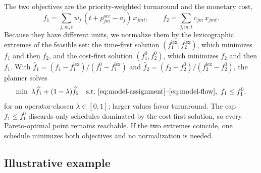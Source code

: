 \documentclass[conference]{IEEEtran}
\begin{document}
The two objectives are the priority-weighted turnaround and the monetary cost,
\begin{equation}
 f_1=\sum_{j,m,t} w_j\,(t+p_{jm}^{\mathrm{occ}}-a_j)\,x_{jmt},\qquad
 f_2=\sum_{j,m,t} c_{jm}\,x_{jmt}.
\end{equation}
Because they have different units, we normalize them by the lexicographic extremes of the feasible set: the time-first solution $(f_1^{\mathrm{lex}},f_2^{\mathrm{lex}})$, which minimizes $f_1$ and then $f_2$, and the cost-first solution $(f_1^{0},f_2^{0})$, which minimizes $f_2$ and then $f_1$. With $\widehat f_1=(f_1-f_1^{\mathrm{lex}})/(f_1^0-f_1^{\mathrm{lex}})$ and $\widehat f_2=(f_2-f_2^0)/(f_2^{\mathrm{lex}}-f_2^0)$, the planner solves
\begin{equation}
\label{eq:scalarization}
\min\ \lambda\widehat f_1+(1-\lambda)\widehat f_2\quad\text{s.t.}\ \eqref{eq:model-assignment}\text{--}\eqref{eq:model-flow},\ f_1\leq f_1^0,
\end{equation}
for an operator-chosen $\lambda\in[0,1]$; larger values favor turnaround. The cap $f_1\leq f_1^0$ discards only schedules dominated by the cost-first solution, so every Pareto-optimal point remains reachable. If the two extremes coincide, one schedule minimizes both objectives and no normalization is needed.

\subsection{Illustrative example}
\label{sec:example}
\end{document}
